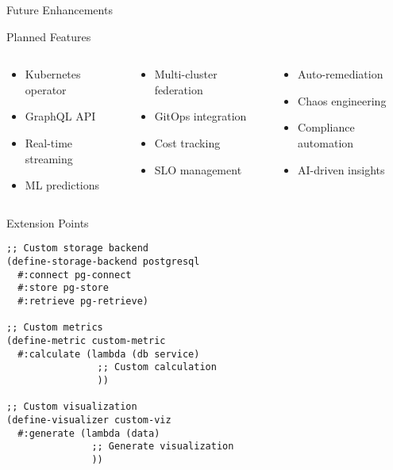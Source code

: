 \documentclass[presentation,aspectratio=169]{beamer}
\begin{document}
\begin{frame}[label={sec:org0f10058},fragile]{Future Enhancements}
 \begin{block}{Planned Features}
\begin{columns}
\begin{column}{0.33\columnwidth}
\begin{itemize}
\item Kubernetes operator
\item GraphQL API
\item Real-time streaming
\item ML predictions
\end{itemize}
\end{column}
\begin{column}{0.33\columnwidth}
\begin{itemize}
\item Multi-cluster federation
\item GitOps integration
\item Cost tracking
\item SLO management
\end{itemize}
\end{column}
\begin{column}{0.34\columnwidth}
\begin{itemize}
\item Auto-remediation
\item Chaos engineering
\item Compliance automation
\item AI-driven insights
\end{itemize}
\end{column}
\end{columns}
\end{block}
\begin{block}{Extension Points}
\begin{verbatim}
;; Custom storage backend
(define-storage-backend postgresql
  #:connect pg-connect
  #:store pg-store
  #:retrieve pg-retrieve)

;; Custom metrics
(define-metric custom-metric
  #:calculate (lambda (db service)
                ;; Custom calculation
                ))

;; Custom visualization
(define-visualizer custom-viz
  #:generate (lambda (data)
               ;; Generate visualization
               ))
\end{verbatim}
\end{block}
\end{frame}
\end{document}
